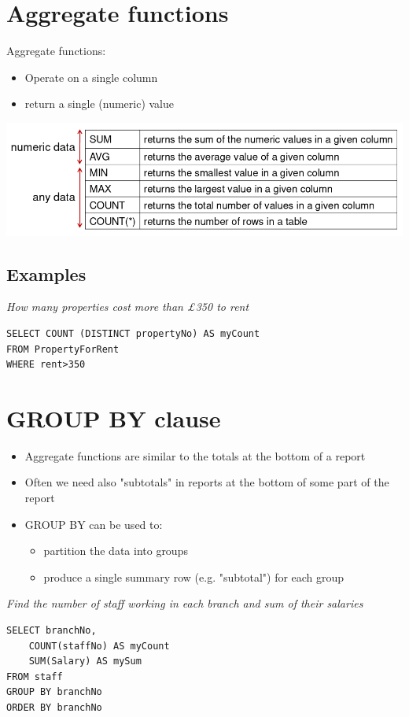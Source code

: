\documentclass{article}[18pt]
\begin{document}
\section{Aggregate functions}
Aggregate functions:
\begin{itemize}
	\item Operate on a single column
	\item return a single (numeric) value
\end{itemize}
\begin{center}
	\includegraphics[scale=0.7]{Aggregate}
\end{center}
\subsection{Examples}
\textit{How many properties cost more than £350 to rent}
\begin{verbatim}
SELECT COUNT (DISTINCT propertyNo) AS myCount
FROM PropertyForRent
WHERE rent>350
\end{verbatim}
\section{GROUP BY clause}
\begin{itemize}
	\item Aggregate functions are similar to the totals at the bottom of a report
	\item Often we need also "subtotals" in reports at the bottom of some part of the report
	\item GROUP BY can be used to:
	\begin{itemize}
		\item partition the data into groups
		\item produce a single summary row (e.g. "subtotal") for each group
	\end{itemize}
\end{itemize}
\textit{Find the number of staff working in each branch and sum of their salaries}
\begin{verbatim}
SELECT branchNo,
	COUNT(staffNo) AS myCount
	SUM(Salary) AS mySum
FROM staff
GROUP BY branchNo
ORDER BY branchNo
\end{verbatim}
\end{document}
